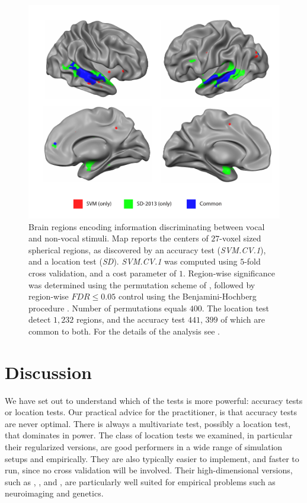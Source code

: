 \documentclass[12pt,a4paper]{article}
\begin{document}
\begin{figure}[th]
\centering
\includegraphics[width=0.5\linewidth]{"art/svm_vs_SD"}
\caption{\footnotesize
Brain regions encoding information discriminating between vocal and non-vocal stimuli.
Map reports the centers of $27$-voxel sized spherical regions, as discovered by an accuracy test (\emph{SVM.CV.1}), and a location test (\emph{SD}). 
\emph{SVM.CV.1} was computed using $5$-fold cross validation, and a cost parameter of $1$. 
Region-wise significance was determined using the permutation scheme of \cite{stelzer_statistical_2013}, followed by region-wise $FDR \leq 0.05$ control using the Benjamini-Hochberg procedure \citep{benjamini_controlling_1995}.
Number of permutations equals $400$.
The location test detect $1,232$ regions, and the accuracy test $441$, $399$ of which are common to both.
For the details of the analysis see \cite{gilron_quantifying_2016}.  
  }
\label{fig:read_data}
\end{figure}








\section{Discussion}
\label{sec:discussion}

We have set out to understand which of the tests is more powerful: accuracy tests or location tests. 
Our practical advice for the practitioner, is that accuracy tests are never optimal. 
There is always a multivariate test, possibly a location test, that dominates in power. 
The class of location tests we examined, in particular their regularized versions, are good performers in a wide range of simulation setups and empirically. 
They are also typically easier to implement, and faster to run, since no cross validation will be involved. 
Their high-dimensional versions, such as \cite{schafer_shrinkage_2005}, \cite{goeman2006testing}, and \cite{srivastava_multivariate_2007}, are particularly well suited for empirical problems such as neuroimaging and genetics.
\end{document}
